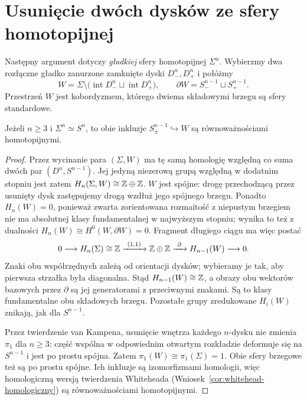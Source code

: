 \section{Usunięcie dwóch dysków ze sfery homotopijnej}
\label{sec:poincare-high}

Następny argument dotyczy \emph{gładkiej}
sfery homotopijnej $\Sigma^n$.
Wybierzmy dwa rozłączne gładko
zanurzone zamknięte dyski $D_-^n,D_+^n$
i połóżmy
\[
 W=\Sigma\setminus
   \bigl(\operatorname{int}D_-^n
          \sqcup\operatorname{int}D_+^n\bigr),
 \qquad
 \partial W=S_-^{n-1}\sqcup S_+^{n-1}.
\]
Przestrzeń $W$ jest kobordyzmem,
którego dwiema składowymi brzegu
są sfery standardowe.

\begin{lemat}
\label{lem:punctured-sphere-hc-24}
Jeżeli $n\geq3$ i $\Sigma^n\simeq S^n$,
to obie inkluzje
$S_\pm^{n-1}\hookrightarrow W$
są równoważnościami homotopijnymi.
\end{lemat}
\begin{proof}
Przez wycinanie para $(\Sigma,W)$
ma tę samą homologię względną
co suma dwóch par $(D^n,S^{n-1})$.
Jej jedyną niezerową grupą względną
w dodatnim stopniu jest zatem
$H_n(\Sigma,W)\cong\mathbb{Z}\oplus\mathbb{Z}$.
$W$ jest spójne: drogę przechodzącą przez usunięty
dysk zastępujemy drogą wzdłuż jego spójnego brzegu.
Ponadto $H_n(W)=0$, ponieważ zwarta zorientowana
rozmaitość z niepustym brzegiem nie ma absolutnej
klasy fundamentalnej w najwyższym stopniu;
wynika to też z dualności
$H_n(W)\cong H^0(W,\partial W)=0$.
Fragment długiego ciągu ma więc postać
\[
 0\longrightarrow H_n(\Sigma)\cong\mathbb{Z}
 \xrightarrow{\ (1,1)\ }
 \mathbb{Z}\oplus\mathbb{Z}
 \xrightarrow{\ \partial\ }
 H_{n-1}(W)\longrightarrow0.
\]
Znaki obu współrzędnych zależą od
orientacji dysków; wybieramy je tak,
aby pierwsza strzałka była diagonalna.
Stąd $H_{n-1}(W)\cong\mathbb{Z}$, a obrazy
obu wektorów bazowych przez $\partial$
są jej generatorami z przeciwnymi znakami.
Są to klasy fundamentalne obu składowych
brzegu. Pozostałe grupy zredukowane
$H_i(W)$ znikają, jak dla $S^{n-1}$.

Przez twierdzenie van Kampena,
usunięcie wnętrza każdego $n$-dysku
nie zmienia $\pi_1$ dla $n\geq3$:
część wspólna w odpowiednim otwartym
rozkładzie deformuje się na
$S^{n-1}$ i jest po prostu spójna.
Zatem $\pi_1(W)\cong\pi_1(\Sigma)=1$.
Obie sfery brzegowe też są po prostu
spójne. Ich inkluzje są izomorfizmami
homologii, więc homologiczną wersją
twierdzenia Whiteheada
(Wniosek~\ref{cor:whitehead-homologiczny})
są równoważnościami homotopijnymi.
\end{proof}

